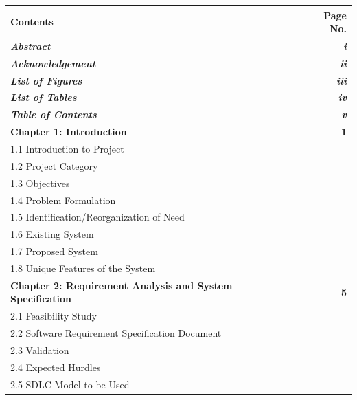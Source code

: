 \documentclass[12pt,a4paper]{report}
\begin{document}
{\centering
\fontsize{14pt}{16pt}\selectfont
\begin{tabular*}{\textwidth}{@{\extracolsep{\fill}} l r}
    \toprule
    \textbf{Contents} & \textbf{Page No.} \\
    \midrule
    \textbf{\textit{Abstract}} & \textbf{\textit{i}} \\
    \textbf{\textit{Acknowledgement}} & \textbf{\textit{ii}} \\
    \textbf{\textit{List of Figures}} & \textbf{\textit{iii}} \\
    \textbf{\textit{List of Tables}} & \textbf{\textit{iv}} \\
    \textbf{\textit{Table of Contents}} & \textbf{\textit{v}} \\
    \textbf{Chapter 1: Introduction} & \textbf{1} \\
    \hspace{2.4cm}1.1 Introduction to Project & \\
    \hspace{2.4cm}1.2 Project Category &  \\
    \hspace{2.4cm}1.3 Objectives & \\
    \hspace{2.4cm}1.4 Problem Formulation & \\
    \hspace{2.4cm}1.5 Identification/Reorganization of Need & \\
    \hspace{2.4cm}1.6 Existing System & \\
    \hspace{2.4cm}1.7 Proposed System & \\
    \hspace{2.4cm}1.8 Unique Features of the System & \\
    \textbf{Chapter 2: Requirement Analysis and System Specification} & \textbf{5} \\
    \hspace{2.4cm}2.1 Feasibility Study & \\
    \hspace{2.4cm}2.2 Software Requirement Specification Document &  \\
    \hspace{2.4cm}2.3 Validation & \\
    \hspace{2.4cm}2.4 Expected Hurdles & \\
    \hspace{2.4cm}2.5 SDLC Model to be Used & \\
\end{tabular*}\par}
\end{document}
